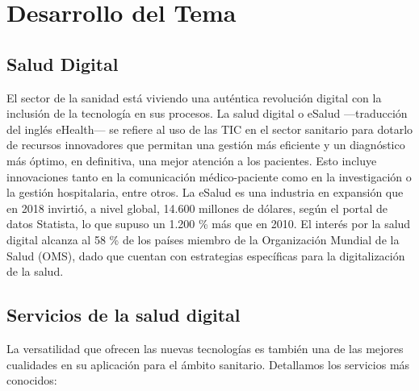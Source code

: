 \documentclass[12pt]{article}
\begin{document}
\section{Desarrollo del Tema}

\subsection*{Salud Digital}
El sector de la sanidad está viviendo una auténtica revolución digital con la inclusión de la tecnología en sus procesos. La salud digital o eSalud —traducción del inglés eHealth— se refiere al uso de las TIC en el sector sanitario para dotarlo de recursos innovadores que permitan una gestión más eficiente y un diagnóstico más óptimo, en definitiva, una mejor atención a los pacientes. Esto incluye innovaciones tanto en la comunicación médico-paciente como en la investigación o la gestión hospitalaria, entre otros.
La eSalud es una industria en expansión que en 2018 invirtió, a nivel global, 14.600 millones de dólares, según el portal de datos Statista, lo que supuso un 1.200 \% más que en 2010. El interés por la salud digital alcanza al 58 \% de los países miembro de la Organización Mundial de la Salud (OMS), dado que cuentan con estrategias específicas para la digitalización de la salud.

\subsection*{Servicios de la salud digital}
La versatilidad que ofrecen las nuevas tecnologías es también una de las mejores cualidades en su aplicación para el ámbito sanitario. Detallamos los servicios más conocidos:
\end{document}
